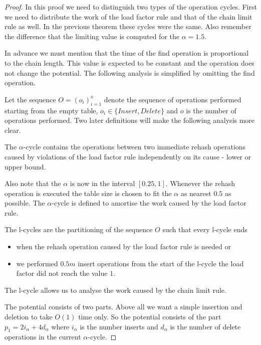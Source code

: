 \begin{proof}
In this proof we need to distinguish two types of the operation cycles. First we need to distribute the work of the load factor rule and that of the chain limit rule as well. In the previous theorem these cycles were the same. Also remember the difference that the limiting value is computed for the $\alpha = 1.5$.

In advance we must mention that the time of the find operation is proportional to the chain length. This value is expected to be constant and the operation does not change the potential. The following analysis is simplified by omitting the find operation.

Let the sequence $O = (o_i)_{i=1}^o$ denote the sequence of operations performed starting from the empty table, $o_i \in \lbrace Insert, Delete \rbrace$ and $o$ is the number of operations performed. Two later definitions will make the following analysis more clear.

\begin{definition}
The $\alpha$-cycle contains the operations between two immediate rehash operations caused by violations of the load factor rule independently on its cause - lower or upper bound. 
\end{definition}
Also note that the $\alpha$ is now in the interval $\left[0.25, 1\right]$. Whenever the rehash operation is executed the table size is chosen to fit the $\alpha$ as nearest $0.5$ as possible. The $\alpha$-cycle is defined to amortise the work caused by the load factor rule.

\begin{definition}[l-cycle]
The l-cycles are the partitioning of the sequence $O$ such that every l-cycle ends
\begin{itemize}
\item when the rehash operation caused by the load factor rule is needed or
\item we performed $0.5 m$ insert operations from the start of the l-cycle the load factor did not reach the value $1$.
\end{itemize}
\end{definition}
The l-cycle allows us to analyse the work caused by the chain limit rule.

The potential consists of two parts. Above all we want a simple insertion and deletion to take $O(1)$ time only. So the potential consists of the part $p_1 = 2i_{\alpha} + 4d_{\alpha}$ where $i_{\alpha}$ is the number inserts and $d_{\alpha}$ is the number of delete operations in the current $\alpha$-cycle. 


\end{proof}
